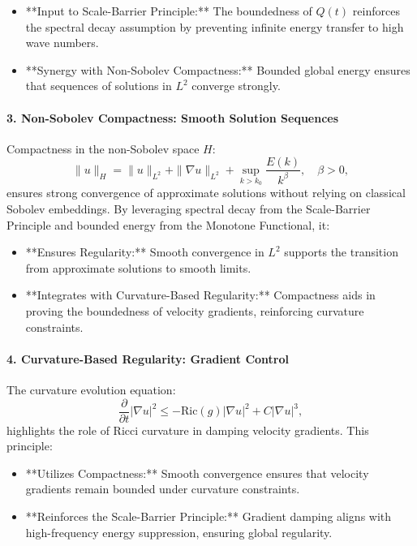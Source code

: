 \begin{itemize}
    \item **Input to Scale-Barrier Principle:** The boundedness of $Q(t)$ reinforces the spectral decay assumption by preventing infinite energy transfer to high wave numbers.
    \item **Synergy with Non-Sobolev Compactness:** Bounded global energy ensures that sequences of solutions in $L^2$ converge strongly.
\end{itemize}

\paragraph{3. Non-Sobolev Compactness: Smooth Solution Sequences}
Compactness in the non-Sobolev space $H$:
\begin{equation}
\|u\|_H = \|u\|_{L^2} + \|\nabla u\|_{L^2} + \sup_{k > k_0} \frac{E(k)}{k^\beta}, \quad \beta > 0,
\end{equation}
ensures strong convergence of approximate solutions without relying on classical Sobolev embeddings. By leveraging spectral decay from the Scale-Barrier Principle and bounded energy from the Monotone Functional, it:
\begin{itemize}
    \item **Ensures Regularity:** Smooth convergence in $L^2$ supports the transition from approximate solutions to smooth limits.
    \item **Integrates with Curvature-Based Regularity:** Compactness aids in proving the boundedness of velocity gradients, reinforcing curvature constraints.
\end{itemize}

\paragraph{4. Curvature-Based Regularity: Gradient Control}
The curvature evolution equation:
\begin{equation}
\frac{\partial}{\partial t} |\nabla u|^2 \leq -\text{Ric}(g)|\nabla u|^2 + C|\nabla u|^3,
\end{equation}
highlights the role of Ricci curvature in damping velocity gradients. This principle:
\begin{itemize}
    \item **Utilizes Compactness:** Smooth convergence ensures that velocity gradients remain bounded under curvature constraints.
    \item **Reinforces the Scale-Barrier Principle:** Gradient damping aligns with high-frequency energy suppression, ensuring global regularity.
\end{itemize}

